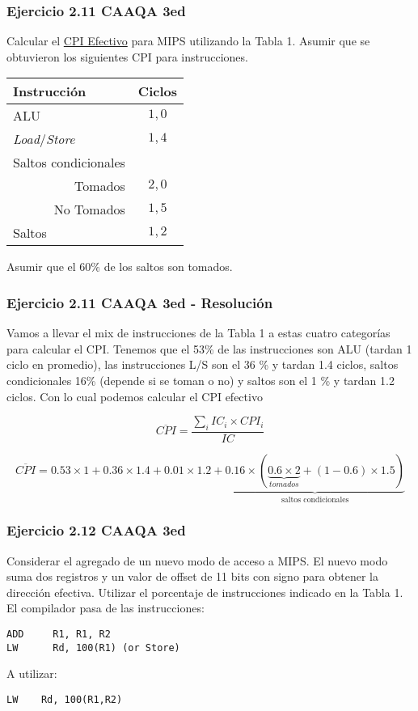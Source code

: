 \documentclass{beamer}
\begin{document}
\begin{frame}
 \frametitle{Ejercicio 2.11 CAAQA 3ed}
            Calcular el \underline{CPI Efectivo} para MIPS utilizando la Tabla 1. Asumir que se obtuvieron los siguientes CPI para instrucciones.

            \begin{center}
            \begin{tabular}{||l|c||}
            \hline
            Instrucción & Ciclos \\
            \hline
            ALU & $1,0$ \\\hline
            \textit{Load}/\textit{Store} & $1,4$ \\\hline
            Saltos condicionales & \\\hline
            \multicolumn{1}{||r|}{Tomados} & $2,0$ \\\hline
            \multicolumn{1}{||r|}{No Tomados} & $1,5$ \\\hline
            Saltos & $1,2$ \\\hline
            \end{tabular}
            \end{center}

            Asumir que el $60\%$ de los saltos son tomados.
 
\end{frame}

\begin{frame}
 \frametitle{Ejercicio 2.11 CAAQA 3ed - Resolución}
 Vamos a llevar el mix de instrucciones de la Tabla 1 a estas cuatro categorías para calcular el CPI. Tenemos que el 53\% de las instrucciones son ALU (tardan 1 ciclo en promedio), las instrucciones L/S son el 36 \% y tardan 1.4 ciclos, saltos condicionales 16\% (depende si se toman o no) y saltos son el 1 \% y tardan 1.2 ciclos. Con lo cual podemos calcular el CPI efectivo
 
 \[ \overline{CPI} = \frac{\sum_i IC_i \times CPI_i}{IC}\]
 
 \[ \overline{CPI} = 0.53 \times 1 + 0.36 \times 1.4 + 0.01 \times 1.2 + \underbrace{0.16 \times ( \underbrace{0.6 \times 2}_{tomados} + (1-0.6) \times 1.5)}_{\text{saltos condicionales}} \]

\end{frame}
\begin{frame}[fragile]
 \frametitle{Ejercicio 2.12 CAAQA 3ed}
 
 Considerar el agregado de un nuevo modo de acceso a MIPS. El nuevo modo suma dos registros y un valor de offset de 11 bits con signo para obtener la dirección efectiva. Utilizar el porcentaje de instrucciones indicado en la Tabla 1. El compilador pasa de las instrucciones: 
    
\begin{lstlisting}
ADD     R1, R1, R2
LW      Rd, 100(R1)	(or Store)
 \end{lstlisting}

A utilizar:
\begin{lstlisting}
LW    Rd, 100(R1,R2)
 \end{lstlisting}

\end{frame}
\end{document}
